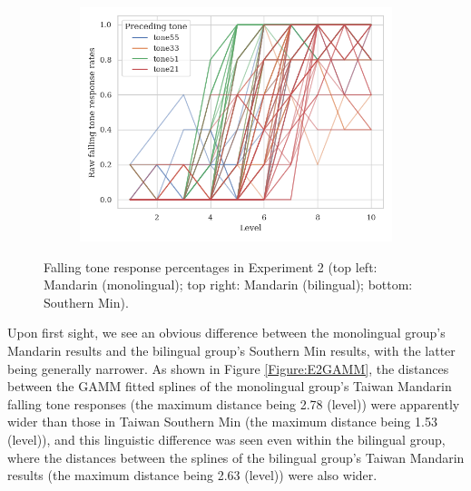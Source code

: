 \begin{figure}[hbt!]
\begin{subfigure}[b]{.45\textwidth}
\includegraphics[width=\textwidth]{figures/E2/Min_E2_raw.png}
\end{subfigure}
\caption{Falling tone response percentages in Experiment 2 (top left: Mandarin (monolingual); top right: Mandarin (bilingual); bottom: Southern Min).}
\label{Figure:E2Raw}
\end{figure}

Upon first sight, we see an obvious difference between the monolingual group's Mandarin results and the bilingual group's Southern Min results, with the latter being generally narrower. As shown in Figure \ref{Figure:E2GAMM}, the distances between the GAMM fitted splines of the monolingual group's Taiwan Mandarin falling tone responses (the maximum distance being 2.78 (level)) were apparently wider than those in Taiwan Southern Min (the maximum distance being 1.53 (level)), and this linguistic difference was seen even within the bilingual group, where the distances between the splines of the bilingual group's Taiwan Mandarin results (the maximum distance being 2.63 (level)) were also wider.

